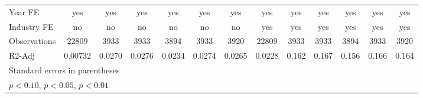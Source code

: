 {\begin{tabular}{l*{12}{c}}
\hline
Year FE             &         yes         &         yes         &         yes         &         yes         &         yes         &         yes         &         yes         &         yes         &         yes         &         yes         &         yes         &         yes         \\
Industry FE         &          no         &          no         &          no         &          no         &          no         &          no         &         yes         &         yes         &         yes         &         yes         &         yes         &         yes         \\
Observations        &       22809         &        3933         &        3933         &        3894         &        3933         &        3920         &       22809         &        3933         &        3933         &        3894         &        3933         &        3920         \\
R2-Adj              &     0.00732         &      0.0270         &      0.0276         &      0.0234         &      0.0274         &      0.0265         &      0.0228         &       0.162         &       0.167         &       0.156         &       0.166         &       0.164         \\
\hline\hline
\multicolumn{13}{l}{\footnotesize Standard errors in parentheses}\\
\multicolumn{13}{l}{\footnotesize \sym{*} \(p<0.10\), \sym{**} \(p<0.05\), \sym{***} \(p<0.01\)}\\
\end{tabular}
}
